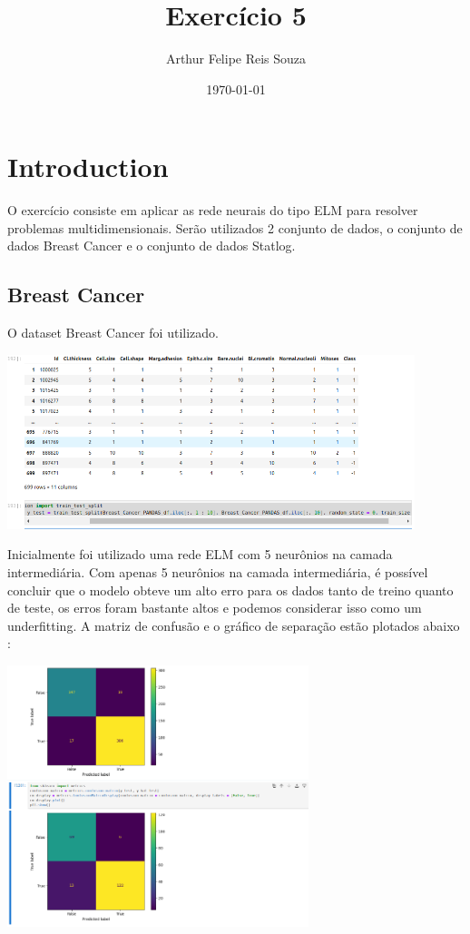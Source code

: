 \documentclass{article}
\begin{document}
\title{Exercício 5} 
\author{Arthur Felipe Reis Souza}
\date{\today}
\maketitle

\section{Introduction}
O exercício consiste em aplicar as rede neurais do tipo ELM para resolver problemas multidimensionais. Serão utilizados 2 conjunto de dados, o conjunto de dados Breast Cancer e o conjunto de dados Statlog.
\vspace{20pt}

\subsection{Breast Cancer}
O dataset Breast Cancer foi utilizado.

\begin{center}

\includegraphics[height=2in]{Ex6/Breast_Cancer/Plot_Breast.png}

\end{center}

\vspace{10pt}
Inicialmente foi utilizado uma rede ELM com 5 neurônios na camada intermediária. Com apenas 5 neurônios na camada intermediária, é possível concluir que o modelo obteve um alto erro para os dados tanto de treino quanto de teste, os erros foram bastante altos e podemos considerar isso como um underfitting. A matriz de confusão e o gráfico de separação estão plotados abaixo :

\begin{center}

\includegraphics[height=3in]{Ex6/Breast_Cancer/matrix_conf_5.png}
\vspace{10pt}

\end{center}
\end{document}

